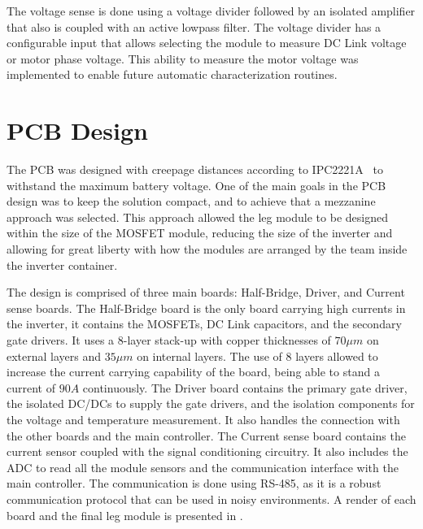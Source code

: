 The voltage sense is done using a voltage divider followed by an isolated amplifier that also is coupled with an active lowpass filter. The voltage divider has a configurable input that allows selecting the module to measure DC Link voltage or motor phase voltage. This ability to measure the motor voltage was implemented to enable future automatic characterization routines.

\section{PCB Design}

The PCB was designed with creepage distances according to IPC2221A~\cite{IPC-2221:1998} to withstand the maximum battery voltage. One of the main goals in the PCB design was to keep the solution compact, and to achieve that a mezzanine approach was selected. This approach allowed the leg module to be designed within the size of the MOSFET module, reducing the size of the inverter and allowing for great liberty with how the modules are arranged by the team inside the inverter container. 

The design is comprised of three main boards: Half-Bridge, Driver, and Current sense boards. The Half-Bridge board is the only board carrying high currents in the inverter, it contains the MOSFETs, DC Link capacitors, and the secondary gate drivers. It uses a 8-layer stack-up with copper thicknesses of $70\mu m$ on external layers and $35\mu m$ on internal layers. The use of 8 layers allowed to increase the current carrying capability of the board, being able to stand a current of $90A$ continuously. The Driver board contains the primary gate driver, the isolated DC/DCs to supply the gate drivers, and the isolation components for the voltage and temperature measurement. It also handles the connection with the other boards and the main controller. The Current sense board contains the current sensor coupled with the signal conditioning circuitry. It also includes the ADC to read all the module sensors and the communication interface with the main controller. The communication is done using RS-485, as it is a robust communication protocol that can be used in noisy environments. A render of each board and the final leg module is presented in .


